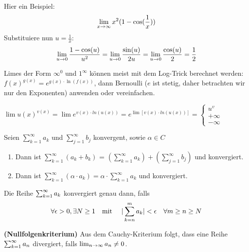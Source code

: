 
Hier ein Beispiel:
$$\lim\limits_{x \to \infty} x^2(1 - \cos(\frac{1}{x}))$$
Substituiere nun $u = \frac{1}{x}$:
$$\lim\limits_{u \to 0} \frac{1 - \cos(u)}{u^2} = \lim\limits_{u \to 0} \frac{\sin(u)}{2u} = \lim\limits_{u \to 0} \frac{\cos(u)}{2} = \frac{1}{2}$$


\vspace*{0mm}
\columnbreak



Limes der Form $\infty^0$ und $1^\infty$ können meist mit dem Log-Trick berechnet werden:
$f(x)^{g(x)} = e^{g(x) \cdot \ln(f(x))}$, dann Bernoulli ($e$ ist stetig, daher betrachten wir nur den
 Exponenten) anwenden oder vereinfachen.

$\lim u(x)^{v(x)} = \lim e^{v(x)\cdot ln(u(x))} = e^{\lim [v(x)\cdot ln(u(x))]} = \begin{cases}
	u^v\\
	+\infty\\
	-\infty
\end{cases}$



\begin{tcolorbox}
	\Satz Seien $\sum_{k=1}^{\infty} a_{k}$ und $\sum_{j=1}^{\infty} b_{j}$ konvergent, sowie $\alpha \in C$
	\begin{enumerate}[label=(\arabic*)]
		\item Dann ist $\sum_{k=1}^{\infty} (a_{k} + b_{k})$ = $(\sum_{k=1}^{\infty} a_{k}) + (\sum_{j=1}^{\infty} b_{j})$ und konvergiert.
		\item Dann ist $\sum_{k=1}^{\infty} (\alpha \cdot a_{k}) = \alpha \cdot \sum_{k=1}^{\infty} a_{k}$ und konvergiert.
	\end{enumerate}
\end{tcolorbox}



\Satz Die Reihe $\sum_{k = 1}^{\infty} a_k$ konvergiert genau dann, falls
\vspace*{-6pt}
$$\forall \epsilon > 0, \exists N \geq 1 \text{\quad mit \quad} |\sum_{k = n}^{m}a_k| < \epsilon \quad \forall m \geq n \geq N$$

\begin{tcolorbox}
	\textbf{(Nullfolgenkriterium)} Aus dem Cauchy-Kriterium folgt, dass eine Reihe $\sum_{k = 1}^{\infty} a_n $ divergiert, 
	falls $\lim_{n \rightarrow \infty} a_n \neq 0$.
\end{tcolorbox}



